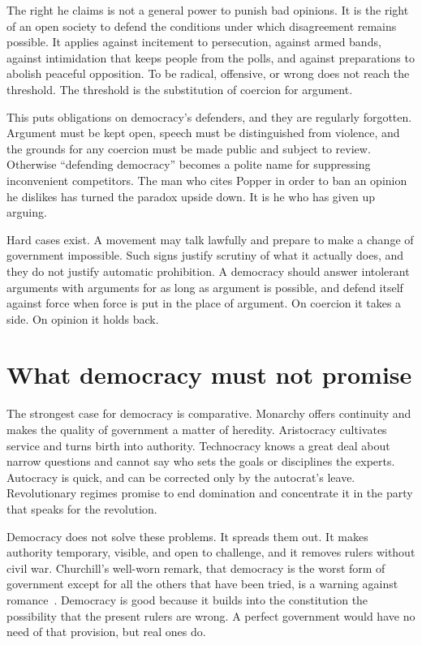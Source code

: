\documentclass[12pt,a4paper]{book}
\begin{document}
The right he claims is not a general power to punish bad opinions. It is the right of an open society to defend the conditions under which disagreement remains possible. It applies against incitement to persecution, against armed bands, against intimidation that keeps people from the polls, and against preparations to abolish peaceful opposition. To be radical, offensive, or wrong does not reach the threshold. The threshold is the substitution of coercion for argument.

This puts obligations on democracy's defenders, and they are regularly forgotten. Argument must be kept open, speech must be distinguished from violence, and the grounds for any coercion must be made public and subject to review. Otherwise ``defending democracy'' becomes a polite name for suppressing inconvenient competitors. The man who cites Popper in order to ban an opinion he dislikes has turned the paradox upside down. It is he who has given up arguing.

Hard cases exist. A movement may talk lawfully and prepare to make a change of government impossible. Such signs justify scrutiny of what it actually does, and they do not justify automatic prohibition. A democracy should answer intolerant arguments with arguments for as long as argument is possible, and defend itself against force when force is put in the place of argument. On coercion it takes a side. On opinion it holds back.

\section{What democracy must not promise}

The strongest case for democracy is comparative. Monarchy offers continuity and makes the quality of government a matter of heredity. Aristocracy cultivates service and turns birth into authority. Technocracy knows a great deal about narrow questions and cannot say who sets the goals or disciplines the experts. Autocracy is quick, and can be corrected only by the autocrat's leave. Revolutionary regimes promise to end domination and concentrate it in the party that speaks for the revolution.

Democracy does not solve these problems. It spreads them out. It makes authority temporary, visible, and open to challenge, and it removes rulers without civil war. Churchill's well-worn remark, that democracy is the worst form of government except for all the others that have been tried, is a warning against romance~\cite{churchill-democracy}. Democracy is good because it builds into the constitution the possibility that the present rulers are wrong. A perfect government would have no need of that provision, but real ones do.
\end{document}
